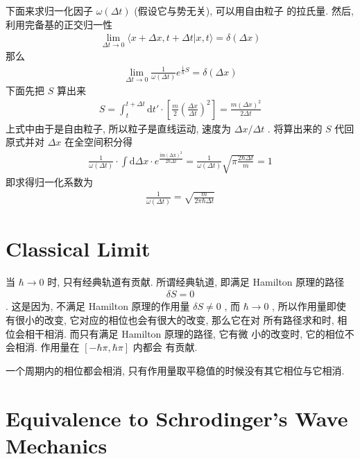 \documentclass[11pt]{article}
\begin{document}
下面来求归一化因子 \(\omega(\Delta t)\) (假设它与势无关), 可以用自由粒子
的拉氏量. 然后, 利用完备基的正交归一性
\begin{align}
  \lim_{\Delta t\to 0}   \langle x +\Delta x , t + \Delta t |x , t \rangle
  = \delta (\Delta x)
\end{align}
那么
\begin{align}
  \lim_{\Delta t\to 0}\frac{1}{\omega(\Delta t)}
   e^{\frac{\mathrm{i}}{\hbar}S} = \delta (\Delta x)
\end{align}
下面先把 \(S\) 算出来
\begin{align}
  S = \int_t^{t+\Delta t} \mathrm{d} t' \cdot \left[
  \frac{m}{2}\left(\frac{\Delta x}{\Delta t}\right)^2  \right]
  = \frac{m (\Delta x) ^2}{2\Delta t}
\end{align}
上式中由于是自由粒子, 所以粒子是直线运动, 速度为 \(\Delta x/\Delta t\) .
将算出来的 \(S\) 代回原式并对 \(\Delta x\) 在全空间积分得
\begin{align}
  \frac{1}{\omega(\Delta t)} \cdot\int \mathrm{d}\Delta x \cdot
  e^{\frac{\mathrm{im (\Delta x)^2}}{2 \hbar \Delta t}}
  =\frac{1}{\omega(\Delta t)} \sqrt{\pi\frac{2\hbar \Delta t}{m}}
  =1
\end{align}
即求得归一化系数为
\begin{align}
  \frac{1}{\omega (\Delta t)} = \sqrt{\frac{m}{2\pi \hbar\Delta t}}
\end{align}

\section{Classical Limit}
\label{sec:org49ff6b9}

当 \(\hbar \to 0\) 时, 只有经典轨道有贡献. 所谓经典轨道, 即满足 Hamilton
原理的路径
\begin{align}
  \delta S = 0
\end{align}
. 这是因为, 不满足 Hamilton 原理的作用量 \(\delta S \neq 0\) , 而 \(\hbar
\to 0\) , 所以作用量即使有很小的改变, 它对应的相位也会有很大的改变, 那么它在对
所有路径求和时, 相位会相干相消. 而只有满足 Hamilton 原理的路径, 它有微
小的改变时, 它的相位不会相消. 作用量在 \([-\hbar \pi, \hbar\pi]\) 内都会
有贡献.

一个周期内的相位都会相消, 只有作用量取平稳值的时候没有其它相位与它相消.

\section{Equivalence to Schrodinger's Wave Mechanics}
\label{sec:org8eb0bc7}
\end{document}
